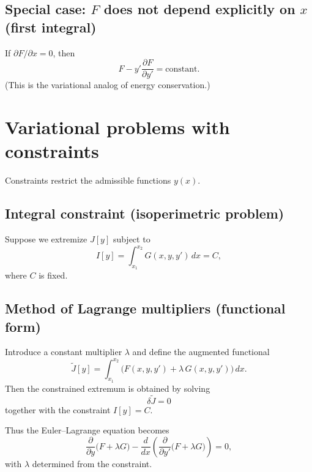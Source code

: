 \subsection{Special case: $F$ does not depend explicitly on $x$ (first integral)}
If $\partial F/\partial x = 0$, then
\begin{equation}
\boxed{
F - y'\frac{\partial F}{\partial y'} = \text{constant}.
}
\end{equation}
(This is the variational analog of energy conservation.)


\section{Variational problems with constraints}

Constraints restrict the admissible functions $y(x)$.

\subsection{Integral constraint (isoperimetric problem)}
Suppose we extremize $J[y]$ subject to
\begin{equation}
I[y] = \int_{x_1}^{x_2} G(x,y,y')\,dx = C,
\end{equation}
where $C$ is fixed.

\subsection{Method of Lagrange multipliers (functional form)}
Introduce a constant multiplier $\lambda$ and define the augmented functional
\begin{equation}
\tilde J[y] = \int_{x_1}^{x_2}\Big(F(x,y,y') + \lambda\,G(x,y,y')\Big)\,dx.
\end{equation}
Then the constrained extremum is obtained by solving
\begin{equation}
\delta \tilde J = 0
\end{equation}
together with the constraint $I[y]=C$.

Thus the Euler--Lagrange equation becomes
\begin{equation}
\boxed{
\frac{\partial}{\partial y}\Big(F+\lambda G\Big)
-
\frac{d}{dx}\left(\frac{\partial}{\partial y'}\Big(F+\lambda G\Big)\right)=0,
}
\end{equation}
with $\lambda$ determined from the constraint.

